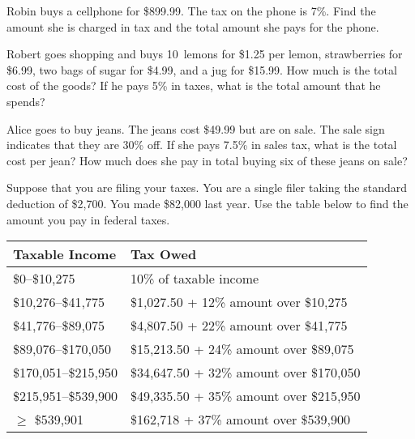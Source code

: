\documentclass[11pt,letterpaper]{article}
\begin{document}

\problem Robin buys a cellphone for \$899.99. The tax on the phone is 7\%. Find the amount she is charged in tax and the total amount she pays for the phone. \pspace

\problem Robert goes shopping and buys 10~lemons for \$1.25 per lemon, strawberries for \$6.99, two bags of sugar for \$4.99, and a jug for \$15.99. How much is the total cost of the goods? If he pays 5\% in taxes, what is the total amount that he spends? \pspace

\problem Alice goes to buy jeans. The jeans cost \$49.99 but are on sale. The sale sign indicates that they are 30\% off. If she pays 7.5\% in sales tax, what is the total cost per jean? How much does she pay in total buying six of these jeans on sale? \pspace

\problem Suppose that you are filing your taxes. You are a single filer taking the standard deduction of \$2,700. You made \$82,000 last year. Use the table below to find the amount you pay in federal taxes. \par
	\begin{table}[!ht]
	\centering
	\begin{tabular}{|l|l|} \hline
	Taxable Income & Tax Owed \\ \hline \hline
	\$0--\$10,275 & 10\% of taxable income \\ \hline
	\$10,276--\$41,775 & \$1,027.50 + 12\% amount over \$10,275 \\ \hline
	\$41,776--\$89,075 & \$4,807.50 + 22\% amount over \$41,775 \\ \hline
	\$89,076--\$170,050 & \$15,213.50 + 24\% amount over \$89,075 \\ \hline
	\$170,051--\$215,950 & \$34,647.50 + 32\% amount over \$170,050 \\ \hline
	\$215,951--\$539,900 & \$49,335.50 + 35\% amount over \$215,950 \\ \hline
	$\geq$ \$539,901 & \$162,718 + 37\% amount over \$539,900 \\ \hline
	\end{tabular}
	\end{table}
\end{document}
